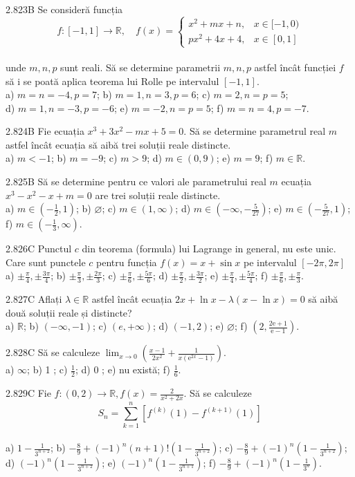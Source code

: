 \documentclass[11pt]{article}
\begin{document}
2.823B Se consideră funcția $$f:[-1,1] \rightarrow \mathbb{R}, \quad f(x)= \begin{cases}x^{2}+m x+n, & x \in[-1,0) \\ p x^{2}+4 x+4, & x \in[0,1]\end{cases}$$\\unde $m, n, p$ sunt reali. Să se determine parametrii $m, n, p$ astfel încât funcției $f$ să i se poată aplica teorema lui Rolle pe intervalul $[-1,1]$.\\ a) $m=n=-4, p=7$; b) $m=1, n=3, p=6$; c) $m=2, n=p=5$;\\ d) $m=1, n=-3, p=-6$; e) $m=-2, n=p=5$; f) $m=n=4, p=-7$.

2.824B Fie ecuația $x^{3}+3 x^{2}-m x+5=0$. Să se determine parametrul real $m$ astfel încât ecuația să aibă trei soluții reale distincte.\\ a) $m<-1$; b) $m=-9$; c) $m>9$; d) $m \in(0,9)$; e) $m=9$; f) $m \in \mathbb{R}$.

2.825B Să se determine pentru ce valori ale parametrului real $m$ ecuația $x^{3}-x^{2}-x+m=0$ are trei soluții reale distincte.\\ a) $m \in\left(-\frac{1}{2}, 1\right)$; b) $\varnothing$; c) $m \in(1, \infty)$; d) $m \in\left(-\infty,-\frac{5}{27}\right)$; e) $m \in\left(-\frac{5}{27}, 1\right)$; f) $m \in\left(-\frac{1}{3}, \infty\right)$.

2.826C Punctul $c$ din teorema (formula) lui Lagrange in general, nu este unic. Care sunt punctele $c$ pentru funcția $f(x)=x+\sin x$ pe intervalul $[-2 \pi, 2 \pi]$\\ a) $\pm \frac{\pi}{4}, \pm \frac{3 \pi}{4}$; b) $\pm \frac{\pi}{3}, \pm \frac{2 \pi}{3}$; c) $\pm \frac{\pi}{6}, \pm \frac{5 \pi}{6}$; d) $\pm \frac{\pi}{2}, \pm \frac{3 \pi}{2}$; e) $\pm \frac{\pi}{4}, \pm \frac{5 \pi}{4}$; f) $\pm \frac{\pi}{6}, \pm \frac{\pi}{3}$.

2.827C Aflați $\lambda \in \mathbb{R}$ astfel încât ecuația $2 x+\ln x-\lambda(x-\ln x)=0$ să aibă două soluții reale și distincte?\\ a) $\mathbb{R}$; b) $(-\infty,-1)$; c) $(e,+\infty)$; d) $(-1,2)$; e) $\varnothing$; f) $\left(2, \frac{2 \mathrm{e}+1}{\mathrm{e}-1}\right)$.

2.828C Să se calculeze $\lim _{x \rightarrow 0}\left(\frac{x-1}{2 x^{2}}+\frac{1}{x\left(\mathrm{e}^{2 x}-1\right)}\right)$.\\ a) $\infty$; b) 1 ; c) $\frac{1}{2}$; d) 0 ; e) nu există; f) $\frac{1}{6}$.

2.829C Fie $f:(0,2) \rightarrow \mathbb{R}, f(x)=\frac{2}{x^{2}+2 x}$. Să se calculeze $$S_{n}=\sum_{k=1}^{n}\left[f^{(k)}(1)-f^{(k+1)}(1)\right]$$\\ a) $1-\frac{1}{3^{n+2}}$; b) $-\frac{8}{9}+(-1)^{n}(n+1)!\left(1-\frac{1}{3^{n+2}}\right)$; c) $-\frac{8}{9}+(-1)^{n}\left(1-\frac{1}{3^{n+2}}\right)$;\\ d) $(-1)^{n}\left(1-\frac{1}{3^{n+2}}\right)$; e) $(-1)^{n}\left(1-\frac{1}{3^{n+1}}\right)$; f) $-\frac{8}{9}+(-1)^{n}\left(1-\frac{1}{3^{n}}\right)$.
\end{document}
